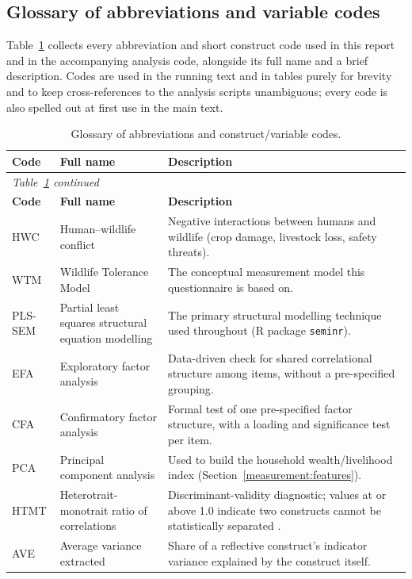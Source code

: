 \subsection{Glossary of abbreviations and variable codes}
\label{app:glossary}

Table~\ref{tab:glossary} collects every abbreviation and short construct
code used in this report and in the accompanying analysis code, alongside
its full name and a brief description. Codes are used in the running text
and in tables purely for brevity and to keep cross-references to the
analysis scripts unambiguous; every code is also spelled out at first use in
the main text.

\begin{longtable}{p{1.9cm}p{3.8cm}p{7.3cm}}
\caption{Glossary of abbreviations and construct/variable codes.}
\label{tab:glossary} \\
\hline
\textbf{Code} & \textbf{Full name} & \textbf{Description} \\
\hline
\endfirsthead
\multicolumn{3}{l}{\textit{Table~\ref{tab:glossary} continued}} \\
\hline
\textbf{Code} & \textbf{Full name} & \textbf{Description} \\
\hline
\endhead
\hline
\endfoot
HWC   & Human--wildlife conflict & Negative interactions between humans and wildlife (crop damage, livestock loss, safety threats). \\
WTM   & Wildlife Tolerance Model & The conceptual measurement model \citep{Kansky2016} this questionnaire is based on. \\
PLS-SEM & Partial least squares structural equation modelling & The primary structural modelling technique used throughout (R package \texttt{seminr}). \\
EFA   & Exploratory factor analysis & Data-driven check for shared correlational structure among items, without a pre-specified grouping. \\
CFA   & Confirmatory factor analysis & Formal test of one pre-specified factor structure, with a loading and significance test per item. \\
PCA   & Principal component analysis & Used to build the household wealth/livelihood index (Section~\ref{measurement:features}). \\
HTMT  & Heterotrait-monotrait ratio of correlations & Discriminant-validity diagnostic; values at or above 1.0 indicate two constructs cannot be statistically separated \citep{Henseler2015}. \\
AVE   & Average variance extracted & Share of a reflective construct's indicator variance explained by the construct itself. \\

\end{longtable}
